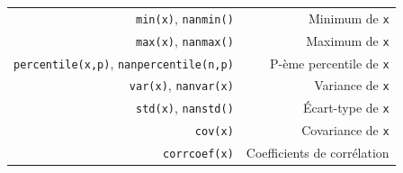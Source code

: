 \documentclass[12pt,]{book}
\numberwithin{equation}{section}
\numberwithin{countremarque}{section}
\begin{document}
\begin{longtable}[]{@{}rr@{}}
\begin{minipage}[t]{0.22\columnwidth}
\texttt{min(x)}, \texttt{nanmin()}\strut
\end{minipage} & \begin{minipage}[t]{0.71\columnwidth}\raggedleft\strut
Minimum de \texttt{x}\strut
\end{minipage}\tabularnewline
\begin{minipage}[t]{0.22\columnwidth}\raggedleft\strut
\texttt{max(x)}, \texttt{nanmax()}\strut
\end{minipage} & \begin{minipage}[t]{0.71\columnwidth}\raggedleft\strut
Maximum de \texttt{x}\strut
\end{minipage}\tabularnewline
\begin{minipage}[t]{0.22\columnwidth}\raggedleft\strut
\texttt{percentile(x,p)}, \texttt{nanpercentile(n,p)}\strut
\end{minipage} & \begin{minipage}[t]{0.71\columnwidth}\raggedleft\strut
P-ème percentile de \texttt{x}\strut
\end{minipage}\tabularnewline
\begin{minipage}[t]{0.22\columnwidth}\raggedleft\strut
\texttt{var(x)}, \texttt{nanvar(x)}\strut
\end{minipage} & \begin{minipage}[t]{0.71\columnwidth}\raggedleft\strut
Variance de \texttt{x}\strut
\end{minipage}\tabularnewline
\begin{minipage}[t]{0.22\columnwidth}\raggedleft\strut
\texttt{std(x)}, \texttt{nanstd()}\strut
\end{minipage} & \begin{minipage}[t]{0.71\columnwidth}\raggedleft\strut
Écart-type de \texttt{x}\strut
\end{minipage}\tabularnewline
\begin{minipage}[t]{0.22\columnwidth}\raggedleft\strut
\texttt{cov(x)}\strut
\end{minipage} & \begin{minipage}[t]{0.71\columnwidth}\raggedleft\strut
Covariance de \texttt{x}\strut
\end{minipage}\tabularnewline
\begin{minipage}[t]{0.22\columnwidth}\raggedleft\strut
\texttt{corrcoef(x)}\strut
\end{minipage} & \begin{minipage}[t]{0.71\columnwidth}\raggedleft\strut
Coefficients de corrélation\strut
\end{minipage}\tabularnewline
\bottomrule
\end{longtable}
\end{document}
